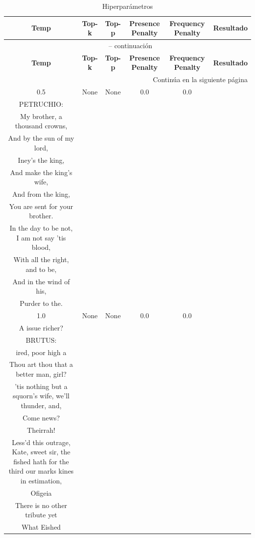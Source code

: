 \documentclass[11pt]{book}
\theoremstyle{plain}
\theoremstyle{definition}
\begin{document}
\begin{longtable}{ccccc >{\raggedright\arraybackslash}p{8cm}}
    \caption{Hiperparámetros}
    \label{tab:resultados_validacion_shakespeare} \\
    \toprule
    \textbf{Temp} & \textbf{Top-k} & \textbf{Top-p} &
    \textbf{Presence Penalty} & \textbf{Frequency Penalty} & \textbf{Resultado} \\
    \midrule
    \endfirsthead
    
    \multicolumn{6}{c}{{\tablename\ \thetable{} -- continuación}} \\
    \toprule
    \textbf{Temp} & \textbf{Top-k} & \textbf{Top-p} &
    \textbf{Presence Penalty} & \textbf{Frequency Penalty} & \textbf{Resultado} \\
    \midrule
    \endhead
    
    \bottomrule
    \multicolumn{6}{r}{{Continúa en la siguiente página}} \\
    \endfoot
    
    \bottomrule
    \endlastfoot
    
    0.5 & None & None & 0.0 & 0.0 &
    \begin{tcolorbox}[breakable, enhanced jigsaw, frame hidden, colback=white, boxrule=0pt]
    KING RICHARD:\\
    PETRUCHIO:\\
    My brother, a thousand crowns,\\
    And by the sun of my lord,\\
    Iney’s the king,\\
    And make the king’s wife,\\
    And from the king,\\
    You are sent for your brother.\\
    In the day to be not, I am not say ’tis blood,\\
    With all the right, and to be,\\
    And in the wind of his,\\
    Purder to the.
    \end{tcolorbox} \\
    
    1.0 & None & None & 0.0 & 0.0 &
    \begin{tcolorbox}[breakable, enhanced jigsaw, frame hidden, colback=white, boxrule=0pt]
    KING RICHARD:\\
    A issue richer?\\
    BRUTUS:\\
    ired, poor high a\\
    Thou art thou that a better man, girl?\\
    'tis nothing but a squorn's wife, we'll thunder, and,\\
    Come news?\\
    Theirrah!\\
    Less'd this outrage, Kate, sweet sir, the fished hath for the third our marks kines in estimation,\\
    Ofigeia\\
    There is no other tribute yet\\
    What Eished
    \end{tcolorbox} \\
    

\end{longtable}
\end{document}
